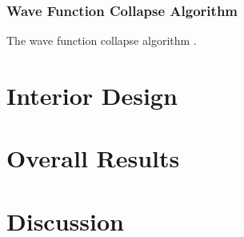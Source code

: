 \documentclass[
oneside,
fontsize=11pt
]{scrartcl}
\begin{document}
\subsubsection{Wave Function Collapse Algorithm}
The wave function collapse algorithm \cite{WFC_GitHub, WFC_YouTube}.




\section{Interior Design}

\section{Overall Results}

\section{Discussion}








\newpage
\appendix  %




\end{document}
